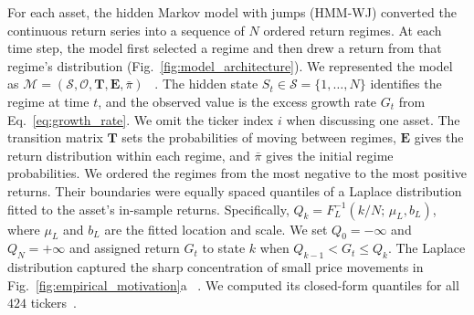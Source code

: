 

For each asset, the hidden Markov model with jumps (HMM-WJ) converted
the continuous return series into a
sequence of $N$ ordered return regimes. At each time step, the model
first selected a regime and then drew a return from that regime's
distribution (Fig.~\ref{fig:model_architecture}). We represented the model as
$\mathcal{M} = (\mathcal{S}, \mathcal{O}, \mathbf{T}, \mathbf{E}, \bar{\pi})$
~\cite{rabinerJuang1986}.
The hidden state $S_t \in \mathcal{S} = \{1,\dots,N\}$ identifies the
regime at time $t$, and the observed value is the excess growth rate
$G_t$ from Eq.~\eqref{eq:growth_rate}. We omit the ticker index
$i$ when discussing one asset. The transition matrix $\mathbf{T}$
sets the probabilities of moving between regimes, $\mathbf{E}$ gives
the return distribution within each regime, and $\bar{\pi}$ gives the
initial regime probabilities. We ordered the regimes from the most
negative to the most positive
returns. Their boundaries were equally spaced quantiles of a Laplace
distribution fitted to the asset's in-sample returns. Specifically,
$Q_k = F_L^{-1}(k/N;\, \mu_L, b_L)$, where $\mu_L$ and $b_L$ are the
fitted location and scale. We set $Q_0=-\infty$ and $Q_N=+\infty$ and
assigned return $G_t$ to state $k$ when $Q_{k-1}<G_t\le Q_k$. The
Laplace distribution captured the sharp concentration of small price
movements in Fig.~\ref{fig:empirical_motivation}a
~\cite{kotzKozubowskiPodgorski2001, tothJones2019}. We computed its
closed-form quantiles for all $424$ tickers~\cite{bilmes1998}.

